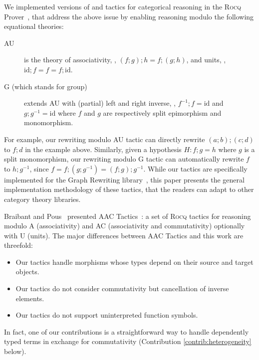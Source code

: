 \documentclass[a4paper,UKenglish,cleveref,autoref]{lipics-v2021}
\newcommand{\Rocq}{{\sffamily\scshape Rocq}\xspace}
\begin{document}
We implemented versions of  and  tactics for categorical reasoning
in the \Rocq Prover~\cite{rocqrefman}, that address the above issue by enabling reasoning modulo the
following equational theories:
\begin{description}
\item[AU] is the theory of
  associativity, \ie, $(f ; g) ; h = f ; (g ; h)$, and
  units, \ie, $\mathrm{id}; f = f = f; \mathrm{id}$.
\item[G (which stands for group)] extends AU with (partial) left and right inverse, \ie,
  $f^{-1} ; f = \mathrm{id}$ and $g ; g^{-1} = \mathrm{id}$ where $f$ and $g$ are respectively split
  epimorphism and monomorphism.
\end{description}
For example, our rewriting modulo AU tactic can directly rewrite $(a ; b) ; (c ; d)$ to $f ; d$ in
the example above.
Similarly, given a hypothesis $H : f ; g = h$ where $g$ is a split monomorphism, our rewriting
modulo G tactic can automatically rewrite $f$ to $h ; g^{-1}$, since
$f = f ; (g ; g^{-1}) = (f ; g) ; g^{-1}$.
While our tactics are specifically implemented for the Graph Rewriting
library~\cite{DBLP:conf/cpp/ArsacHP26}, this paper presents the general
implementation methodology of these tactics, that the readers can adapt to other category theory
libraries.

Braibant and Pous~\cite{DBLP:conf/cpp/BraibantP11} presented AAC Tactics~\cite{aac-tactics}: a set
of \Rocq tactics for reasoning modulo A (associativity) and AC (associativity and commutativity)
optionally with U (units).
The major differences between AAC Tactics and this work are threefold:
\begin{itemize}
\item Our tactics handle morphisms whose types depend on their source and target objects.
\item Our tactics do not consider commutativity but cancellation of inverse elements.
\item Our tactics do not support uninterpreted function symbols.
\end{itemize}
In fact, one of our contributions is a straightforward way to handle dependently typed terms in
exchange for commutativity (\cf Contribution \ref{contrib:heterogeneity} below).
\end{document}
